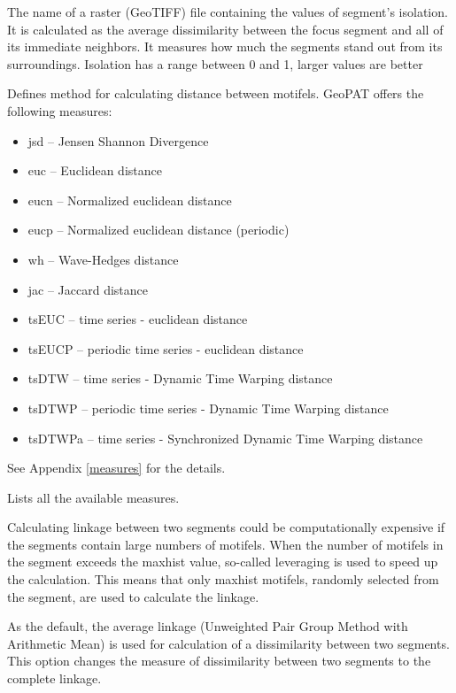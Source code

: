 
The name of a raster (GeoTIFF) file containing the values of segment's isolation. 
It is calculated as the average dissimilarity between the focus segment and all of its immediate neighbors.
It measures how much the segments stand out from its surroundings. 
Isolation has a range between 0 and 1, larger values are better


Defines method for calculating distance between motifels. 
GeoPAT offers the following measures: 
\begin{itemize}
	\item jsd -- Jensen Shannon Divergence
	\item euc -- Euclidean distance
	\item eucn -- Normalized euclidean distance
	\item eucp -- Normalized euclidean distance (periodic)
	\item wh -- Wave-Hedges distance
	\item jac -- Jaccard distance
	\item tsEUC -- time series - euclidean distance
	\item tsEUCP -- periodic time series - euclidean distance
	\item tsDTW -- time series - Dynamic Time Warping distance
	\item tsDTWP -- periodic time series - Dynamic Time Warping distance
	\item tsDTWPa -- time series - Synchronized Dynamic Time Warping distance
\end{itemize}
See Appendix \ref{measures} for the details.


Lists all the available measures.


Calculating linkage between two segments could be computationally expensive if the segments contain large numbers of motifels.
When the number of motifels in the segment exceeds the maxhist value, so-called leveraging is used to speed up the calculation.
This means that only maxhist motifels, randomly selected from the segment, are used to calculate the linkage.


As the default, the average linkage (Unweighted Pair Group Method with Arithmetic Mean) is used for calculation of a dissimilarity between two segments. 
This option changes the measure of dissimilarity between two segments to the complete linkage.

